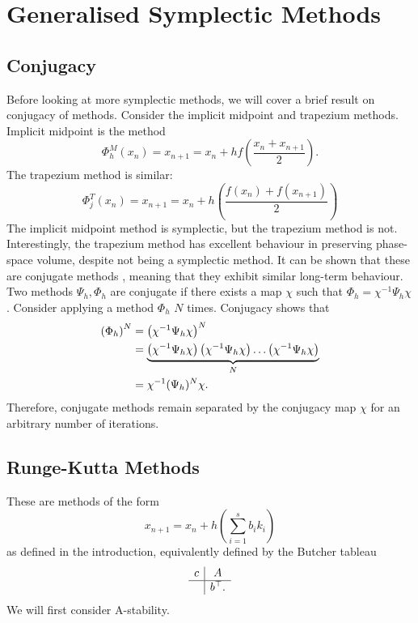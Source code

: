 \section{Generalised Symplectic Methods}

\subsection{Conjugacy}

Before looking at more symplectic methods, we will cover a brief result on conjugacy of methods.
Consider the implicit midpoint and trapezium methods. Implicit midpoint is the method
\begin{equation*}
	\Phi_h^M (x_n) = x_{n+1} = x_n + hf\left(\frac{x_n + x_{n+1}}{2}\right).
\end{equation*}
The trapezium method is similar:
\begin{equation*}
	\Phi_j^T (x_n) = x_{n+1} = x_n + h \left(\frac{f(x_n) + f(x_{n+1})}{2}\right)
\end{equation*}
The implicit midpoint method is symplectic, but the trapezium method is not.
Interestingly, the trapezium method has excellent behaviour in preserving phase-space volume, despite not being a symplectic method.
It can be shown that these are conjugate methods \cite{sanz2018hamiltonian}, meaning that they exhibit similar long-term behaviour.
Two methods $\Psi_h, \Phi_h$ are conjugate if there exists a map $\chi$ such that $\Phi_h = \chi^{-1} \Psi_h \chi$.
Consider applying a method $\Phi_h$ $N$ times. Conjugacy shows that
\begin{align*}
	\left(\Phi_h\right)^N &= \left(\chi^{-1} \Psi_h \chi\right)^N \\
	&= \underbrace{\left(\chi^{-1} \Psi_h \chi \right)\left(\chi^{-1} \Psi_h \chi \right) \mathellipsis \left(\chi^{-1} \Psi_h \chi\right)}_{N} \\
	&= \chi^{-1} (\Psi_h)^N \chi.
\end{align*}
Therefore, conjugate methods remain separated by the conjugacy map $\chi$ for an arbitrary number of iterations.

\subsection{Runge-Kutta Methods}

These are methods of the form
\begin{equation*}
	x_{n+1} = x_n + h \left( \sum_{i = 1}^{s} b_i k_i \right)
\end{equation*}
as defined in the introduction, equivalently defined by the Butcher tableau
\begin{equation*}
	\begin{array}{c|ccc}
		c &A \\
		\hline
		&b^\top .
	\end{array}
\end{equation*}
We will first consider A-stability.

